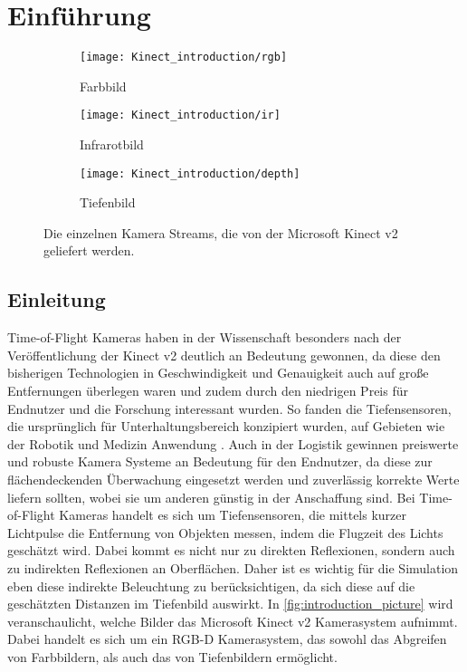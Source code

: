 \documentclass[thesis.tex]{subfiles}
\begin{document}
\chapter{Einführung}
\label{chap:introduction}

\begin{figure}[h!]
\centering
\begin{subfigure}{.32\textwidth}
    \centering
    \texttt{[image: Kinect\_introduction/rgb]}
    \caption{Farbbild}
\end{subfigure}%
\begin{subfigure}{.32\textwidth}
    \centering
    \texttt{[image: Kinect\_introduction/ir]}
    \caption{Infrarotbild}
\end{subfigure}
\begin{subfigure}{.32\textwidth}
    \centering
    \texttt{[image: Kinect\_introduction/depth]}
    \caption{Tiefenbild}
\end{subfigure}
\caption{Die einzelnen Kamera Streams, die von der Microsoft Kinect v2 geliefert werden.}
\label{fig:introduction_picture}
\end{figure}

\section{Einleitung}

Time-of-Flight Kameras haben in der Wissenschaft besonders nach der Veröffentlichung der Kinect v2 deutlich an Bedeutung gewonnen, da diese den bisherigen Technologien in Geschwindigkeit und Genauigkeit auch auf große Entfernungen überlegen waren und zudem durch den niedrigen Preis für Endnutzer und die Forschung interessant wurden. So fanden die Tiefensensoren, die ursprünglich für Unterhaltungsbereich konzipiert wurden, auf Gebieten wie der Robotik und Medizin Anwendung \cite{bib:Meister2013}\cite{bib:Hertzberg2014}\cite{bib:Villena-Martinez2017}. Auch in der Logistik gewinnen preiswerte und robuste Kamera Systeme an Bedeutung für den Endnutzer, da diese zur flächendeckenden Überwachung eingesetzt werden und zuverlässig korrekte Werte liefern sollten, wobei sie um anderen günstig in der Anschaffung sind. Bei Time-of-Flight Kameras handelt es sich um Tiefensensoren, die mittels kurzer Lichtpulse die Entfernung von Objekten messen, indem die Flugzeit des Lichts geschätzt wird. Dabei kommt es nicht nur zu direkten Reflexionen, sondern auch zu indirekten Reflexionen an Oberflächen. Daher ist es wichtig für die Simulation eben diese indirekte Beleuchtung zu berücksichtigen, da sich diese auf die geschätzten Distanzen im Tiefenbild auswirkt. In \autoref{fig:introduction_picture} wird veranschaulicht, welche Bilder das Microsoft Kinect v2 Kamerasystem aufnimmt. Dabei handelt es sich um ein RGB-D Kamerasystem, das sowohl das Abgreifen von Farbbildern, als auch das von Tiefenbildern ermöglicht.
\end{document}
